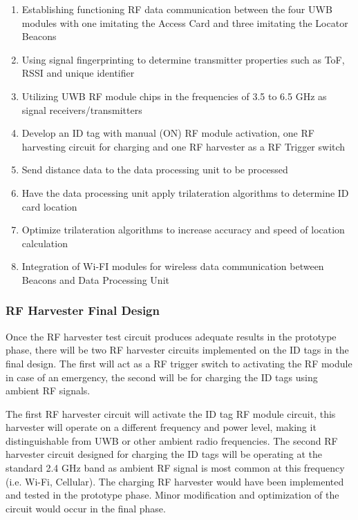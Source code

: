 \begin{enumerate}
    \item Establishing functioning RF data communication between the four UWB modules with one imitating the Access Card and three imitating the Locator Beacons
    \item Using signal fingerprinting to determine transmitter properties such as ToF, RSSI and unique identifier
    \item Utilizing UWB RF module chips in the frequencies of 3.5 to 6.5 GHz as signal receivers/transmitters
    \item Develop an ID tag with manual (ON) RF module activation, one RF harvesting circuit for charging and one RF harvester as a RF Trigger switch
    \item Send distance data to the data processing unit to be processed
    \item Have the data processing unit apply trilateration algorithms to determine ID card location
    \item Optimize trilateration algorithms to increase accuracy and speed of location calculation
    \item Integration of Wi-FI modules for wireless data communication between Beacons and Data Processing Unit
\end{enumerate}

\break
\subsubsection{RF Harvester Final Design}
\medskip
Once the RF harvester test circuit produces adequate results in the prototype phase, there will be two RF harvester circuits implemented on the ID tags in the final design. The first will act as a RF trigger switch to activating the RF module in case of an emergency, the second will be for charging the ID tags using ambient RF signals.

\bigskip
The first RF harvester circuit will activate the ID tag RF module circuit, this harvester will operate on a different frequency and power level, making it distinguishable from UWB or other ambient radio frequencies. The second RF harvester circuit designed for charging the ID tags will be operating at the standard 2.4 GHz band as ambient RF signal is most common at this frequency (i.e. Wi-Fi, Cellular). The charging RF harvester would have been implemented and tested in the prototype phase. Minor modification and optimization of the circuit would occur in the final phase.

